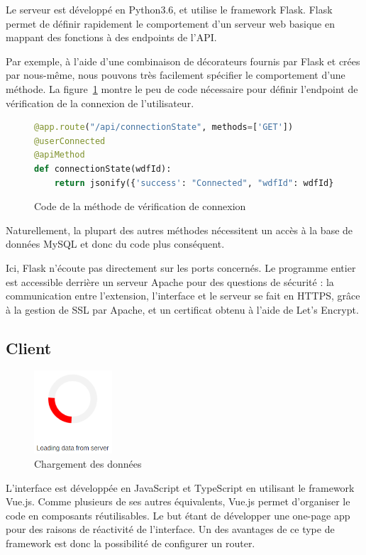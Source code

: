 		Le serveur est développé en Python3.6, et utilise le framework Flask. Flask permet de définir rapidement le comportement d'un serveur web basique en mappant des fonctions à des endpoints de l'API.

		Par exemple, à l'aide d'une combinaison de décorateurs fournis par Flask et crées par nous-même, nous pouvons très facilement spécifier le comportement d'une méthode. La figure~\ref{i-code-server} montre le peu de code nécessaire pour définir l'endpoint de vérification de la connexion de l'utilisateur.

		\begin{figure}[!h]
			\centering
			\begin{lstlisting}[language=python]
@app.route("/api/connectionState", methods=['GET'])
@userConnected
@apiMethod
def connectionState(wdfId):
    return jsonify({'success': "Connected", "wdfId": wdfId})\end{lstlisting}
			\caption{Code de la méthode de vérification de connexion}
			\label{i-code-server}
		\end{figure}

		Naturellement, la plupart des autres méthodes nécessitent un accès à la base de données MySQL et donc du code plus conséquent.

		Ici, Flask n'écoute pas directement sur les ports concernés. Le programme entier est accessible derrière un serveur Apache pour des questions de sécurité : la communication entre l'extension, l'interface et le serveur se fait en HTTPS, grâce à la gestion de SSL par Apache, et un certificat obtenu à l'aide de Let's Encrypt.


	\subsection{Client}

		\begin{figure}
			\includegraphics[width=2.9cm]{images/design/loading_spinner}
			\caption{Chargement des données}\label{i-loading}
		\end{figure} 

		L'interface est développée en JavaScript et TypeScript en utilisant le framework Vue.js. Comme plusieurs de ses autres équivalents, Vue.js permet d'organiser le code en composants réutilisables. Le but étant de développer une one-page app pour des raisons de réactivité de l'interface. Un des avantages de ce type de framework est donc la possibilité de configurer un router.

